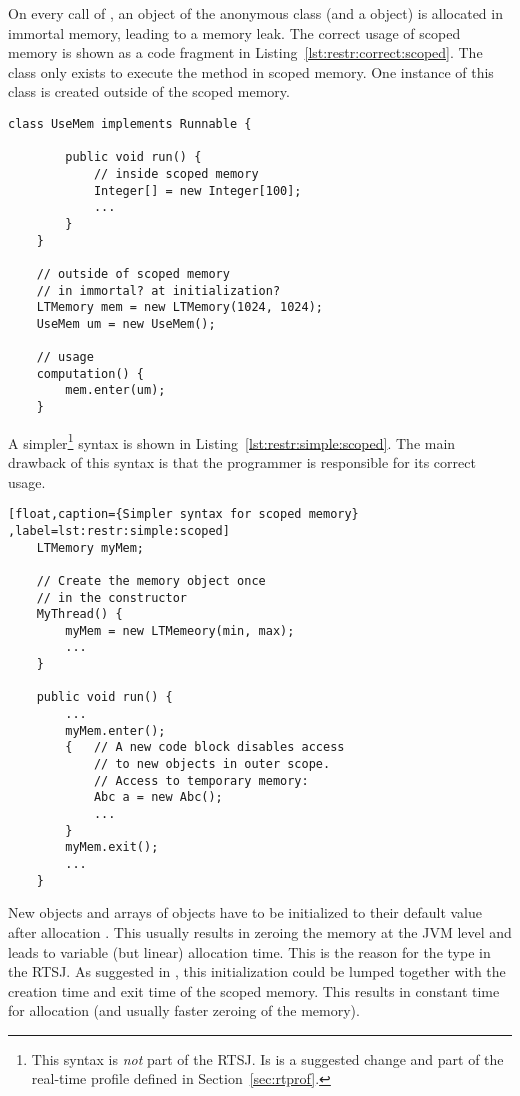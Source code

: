On every call of , an object of the anonymous
class (and a  object) is allocated in immortal
memory, leading to a memory leak. The correct usage of scoped memory
is shown as a code fragment in
Listing~\ref{lst:restr:correct:scoped}. The class  only
exists to execute the method  in scoped memory. One
instance of this class is created outside of the scoped memory.

\begin{lstlisting}[float,caption={Correct usage of scoped memory in the RTSJ},
label=lst:restr:correct:scoped]
    class UseMem implements Runnable {

        public void run() {
            // inside scoped memory
            Integer[] = new Integer[100];
            ...
        }
    }

    // outside of scoped memory
    // in immortal? at initialization?
    LTMemory mem = new LTMemory(1024, 1024);
    UseMem um = new UseMem();

    // usage
    computation() {
        mem.enter(um);
    }
\end{lstlisting}



A simpler\footnote{This syntax is \emph{not} part of the RTSJ. Is is
a suggested change and part of the real-time profile defined in
Section~\ref{sec:rtprof}.} syntax is shown in
Listing~\ref{lst:restr:simple:scoped}. The main drawback of this
syntax is that the programmer is responsible for its correct usage.

\begin{lstlisting}[float,caption={Simpler syntax for scoped memory}
,label=lst:restr:simple:scoped]
    LTMemory myMem;

    // Create the memory object once
    // in the constructor
    MyThread() {
        myMem = new LTMemeory(min, max);
        ...
    }

    public void run() {
        ...
        myMem.enter();
        {   // A new code block disables access
            // to new objects in outer scope.
            // Access to temporary memory:
            Abc a = new Abc();
            ...
        }
        myMem.exit();
        ...
    }
\end{lstlisting}

New objects and arrays of objects have to be initialized to their
default value after allocation \cite{jvm}. This usually results in
zeroing the memory at the JVM level and leads to variable (but
linear) allocation time. This is the reason for the type
 in the RTSJ. As suggested in \cite{701668}, this
initialization could be lumped together with the creation time and
exit time of the scoped memory. This results in constant time for
allocation (and usually faster zeroing of the memory).


